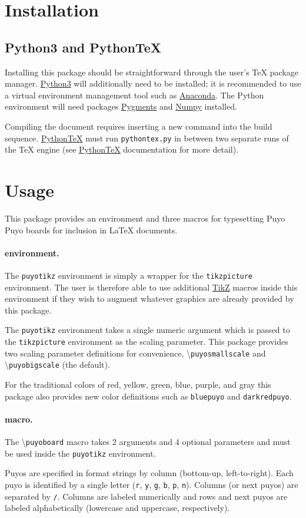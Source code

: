 \documentclass{article}
\newcommand{\latex}{\LaTeX\xspace}
\newcommand{\tex}{\TeX\xspace}
\newcommand{\link}[2]{\href{#1}{\color{darkbluepuyo}#2}}
\newcommand{\code}[1]{{\small\texttt{#1}}}
\newcommand{\cmd}[1]{{\small\textbackslash\texttt{#1}}}
\newcommand{\codepar}[2]{\paragraph{\color{darkgreenpuyo}\code{#1} #2.}\mbox{}\par}
\newcommand{\python}{\link{https://www.python.org/download/releases/3.0/}{Python3}\xspace}
\newcommand{\anaconda}{\link{https://www.anaconda.com/products/individual}{Anaconda}\xspace}
\newcommand{\pypygments}{\link{https://pygments.org/}{Pygments}\xspace}
\newcommand{\pynumpy}{\link{https://numpy.org/}{Numpy}\xspace}
\newcommand{\pythontex}{\link{https://ctan.org/pkg/pythontex?lang=en}{Python\tex}\xspace}
\newcommand{\tikzpgf}{\link{https://ctan.org/pkg/pgf?lang=en}{TikZ}\xspace}
\begin{document}
\section{Installation}
\subsection{Python3 and PythonTeX}
Installing this package should be straightforward through the user's \tex package manager. \python will additionally need to be installed; it is recommended to use a virtual environment management tool such as \anaconda. The Python environment will need packages \pypygments and \pynumpy installed.\par
Compiling the document requires inserting a new command into the build sequence. \pythontex must run \code{pythontex.py} in between two separate runs of the \tex engine (see \pythontex documentation for more detail).

\section{Usage}
This package provides an environment and three macros for typesetting Puyo Puyo boards for inclusion in \latex documents.

\codepar{puyotikz}{environment}
The \code{puyotikz} environment is simply a wrapper for the \code{tikzpicture} environment. The user is therefore able to use additional \tikzpgf macros inside this environment if they wish to augment whatever graphics are already provided by this package.\par
The \code{puyotikz} environment takes a single numeric argument which is passed to the \code{tikzpicture} environment as the scaling parameter. This package provides two scaling parameter definitions for convenience, \cmd{puyosmallscale} and \cmd{puyobigscale} (the default).

\begin{puyolisting}
	\begin{puyotikz}[\puyosmallscale]
	\end{puyotikz}
\end{puyolisting}

For the traditional colors of red, yellow, green, blue, purple, and gray this package also provides new color definitions such as \code{bluepuyo} and \code{darkredpuyo}.

\pagebreak
\codepar{puyoboard}{macro}
The \cmd{puyoboard} macro takes 2 arguments and 4 optional parameters and must be used inside the \code{puyotikz} environment.\par
Puyos are specified in format strings by column (bottom-up, left-to-right). Each puyo is identified by a single letter (\code{r}, \code{y}, \code{g}, \code{b}, \code{p}, \code{n}). Columns (or next puyos) are separated by \code{/}. Columns are labeled numerically and rows and next puyos are labeled alphabetically (lowercase and uppercase, respectively).
\end{document}
